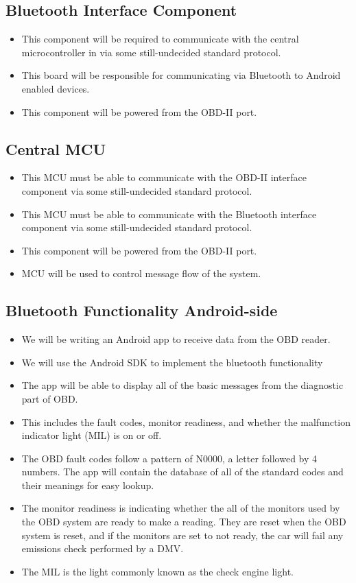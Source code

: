 \documentclass[12pt,letterpaper]{article}
\begin{document}
\subsection{Bluetooth Interface Component}
\begin{itemize}
	\item This component will be required to communicate with the central microcontroller in via some still-undecided standard protocol.
	\item This board will be responsible for communicating via Bluetooth to Android enabled devices.
	\item This component will be powered from the OBD-II port.
\end{itemize}

\subsection{Central MCU}
\begin{itemize}
	\item This MCU must be able to communicate with the OBD-II interface component via some still-undecided standard protocol.
	\item This MCU must be able to communicate with the Bluetooth interface component via some still-undecided standard protocol.
	\item This component will be powered from the OBD-II port.
	\item MCU will be used to control message flow of the system.
\end{itemize} 

\subsection{Bluetooth Functionality Android-side}
\begin{itemize}
	\item We will be writing an Android app to receive data from the OBD reader.
	\item We will use the Android SDK to implement the bluetooth functionality
	\item The app will be able to display all of the basic messages from the diagnostic part of OBD.
	\item This includes the fault codes, monitor readiness, and whether the malfunction indicator light (MIL) is on or off.
	\item The OBD fault codes follow a pattern of N0000, a letter followed by 4 numbers. The app will contain the database of all of the standard codes and their meanings for easy lookup. 
	\item  The monitor readiness is indicating whether the all of the monitors used by the OBD system are ready to make a reading. They are reset when the OBD system is reset, and if the monitors are set to not ready, the car will fail any emissions check performed by a DMV. 
	\item The MIL is the light commonly known as the check engine light. 
\end{itemize}
\end{document}
